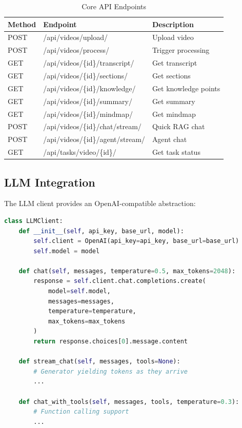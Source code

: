 \documentclass[12pt,a4paper]{article}
\begin{document}
\begin{table}[H]
    \centering
    \caption{Core API Endpoints}
    \begin{tabular}{@{}lll@{}}
        \toprule
        \textbf{Method} & \textbf{Endpoint} & \textbf{Description} \\ \midrule
        POST & /api/videos/upload/ & Upload video \\
        POST & /api/videos/process/ & Trigger processing \\
        GET & /api/videos/\{id\}/transcript/ & Get transcript \\
        GET & /api/videos/\{id\}/sections/ & Get sections \\
        GET & /api/videos/\{id\}/knowledge/ & Get knowledge points \\
        GET & /api/videos/\{id\}/summary/ & Get summary \\
        GET & /api/videos/\{id\}/mindmap/ & Get mindmap \\
        POST & /api/videos/\{id\}/chat/stream/ & Quick RAG chat \\
        POST & /api/videos/\{id\}/agent/stream/ & Agent chat \\
        GET & /api/tasks/video/\{id\}/ & Get task status \\ \bottomrule
    \end{tabular}
\end{table}

\subsection{LLM Integration}

The LLM client provides an OpenAI-compatible abstraction:

\begin{lstlisting}[language=Python, caption={LLM Client Interface}]
class LLMClient:
    def __init__(self, api_key, base_url, model):
        self.client = OpenAI(api_key=api_key, base_url=base_url)
        self.model = model
    
    def chat(self, messages, temperature=0.5, max_tokens=2048):
        response = self.client.chat.completions.create(
            model=self.model,
            messages=messages,
            temperature=temperature,
            max_tokens=max_tokens
        )
        return response.choices[0].message.content
    
    def stream_chat(self, messages, tools=None):
        # Generator yielding tokens as they arrive
        ...
    
    def chat_with_tools(self, messages, tools, temperature=0.3):
        # Function calling support
        ...
\end{lstlisting}
\end{document}
